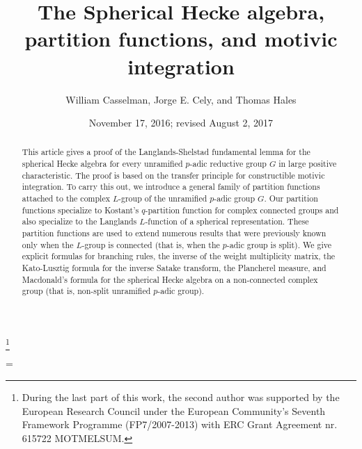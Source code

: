 \documentclass{amsart}
\theoremstyle{plain}
\theoremstyle{definition}
\theoremstyle{remark}
\numberwithin{equation}{subsection}
\begin{document}
\title
    {The Spherical Hecke algebra, partition functions, and motivic integration}
\author{William Casselman, Jorge E. Cely, and Thomas Hales}
\thanks{During the last part of this work, the second author was supported by the European Research Council under the European Community's Seventh Framework Programme (FP7/2007-2013) with ERC Grant Agreement nr. 615722 MOTMELSUM.}
\date{November 17, 2016; revised August 2, 2017}


\begin{abstract}   
This article gives a proof of the Langlands-Shelstad fundamental 
lemma for the spherical Hecke algebra
for every unramified $p$-adic reductive group $G$ in large positive 
characteristic.  The proof is based on the transfer principle
for constructible motivic integration.    To carry this out,
we introduce a general family of partition functions attached to 
the complex $L$-group of the unramified $p$-adic group $G$.
Our partition functions specialize to Kostant's $q$-partition 
function for complex connected groups and also 
specialize to the Langlands $L$-function of a spherical representation.
These partition functions are used to extend numerous 
results that were previously known only when the $L$-group is
connected (that is, when the $p$-adic group is split).
We give explicit formulas for branching rules, the inverse of the weight multiplicity matrix,
the Kato-Lusztig formula for the inverse Satake transform,
the Plancherel measure,  and Macdonald's formula for the spherical Hecke algebra on a
non-connected complex group (that is, non-split unramified $p$-adic group).  
\end{abstract}


\parskip=\baselineskip

 \maketitle



    

      
      
       
      
      
\end{document}
